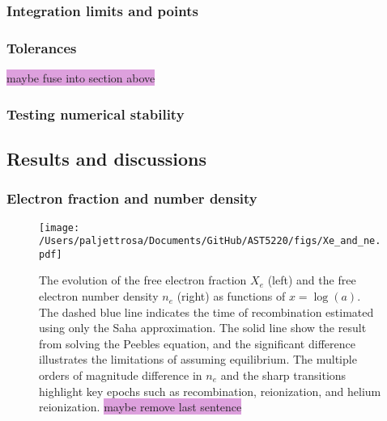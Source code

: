 \documentclass{aa}
\begin{document}
\subsubsection{Integration limits and points}

\subsubsection{Tolerances}
\colorbox{Plum}{maybe fuse into section above}

\subsubsection{Testing numerical stability}


\subsection{Results and discussions}\label{subsec: II results}




\subsubsection{Electron fraction and number density}

\begin{figure*}
  \centering
  \texttt{[image: /Users/paljettrosa/Documents/GitHub/AST5220/figs/Xe\_and\_ne.pdf]}
  \caption{The evolution of the free electron fraction $X_e$ (left) and the free electron number density $n_e$ (right) as functions of $x = \log(a)$. The dashed blue line indicates the time of recombination estimated using only the Saha approximation. The solid line show the result from solving the Peebles equation, and the significant difference illustrates the limitations of assuming equilibrium. The multiple orders of magnitude difference in $n_e$ and the sharp transitions highlight key epochs such as recombination, reionization, and helium reionization. \colorbox{Plum}{maybe remove last sentence}}\label{fig:X_e and n_e}
\end{figure*}
\end{document}
